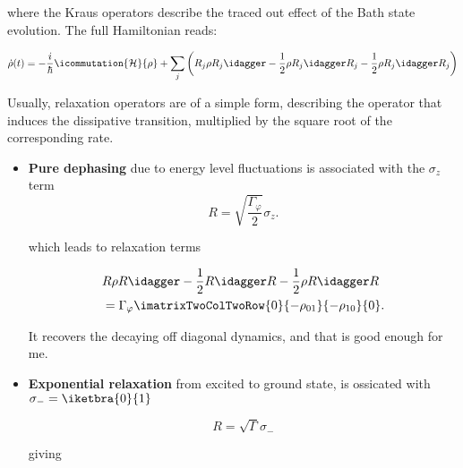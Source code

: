   \noindent where the Kraus operators describe the traced out effect of
  the Bath state evolution.  The full Hamiltonian reads:

 \begin{equation}\label{eq:linrelax_6}
   \dot{\rho}(t) = -\frac{i}{\hbar}\icommutation{\mathcal{H}}{\rho} + \sum_j\left(R_j\rho R_j\idagger - \frac{1}{2}\rho R_j\idagger R_j - \frac{1}{2}\rho R_j\idagger R_j\right)
 \end{equation}


\begin{framed}\noindent
  Usually, relaxation  operators are of  a simple form,  describing the
  operator that  induces the dissipative transition,  multiplied by the
  square root of the corresponding  rate.  
  \begin{itemize}
  \item  \textbf{Pure  dephasing}  due  to  energy  level  fluctuations
     is associated
    with the $ \sigma_z $ term
    \begin{equation}\label{eq:linrelax_7}
      R = \sqrt{\frac{\Gamma_{\varphi}}{2}}\sigma_z.
    \end{equation}

    \noindent which leads to relaxation terms

    \begin{equation}\label{eq:linrelax_8}
      \begin{aligned}
        &R\rho R\idagger - \frac{1}{2}R\idagger R - \frac{1}{2}\rho R\idagger R\\
        &                                                             =
        \Gamma_{\varphi}\imatrixTwoColTwoRow{0}{-\rho_{01}}{-\rho_{10}}{0}.
      \end{aligned}
    \end{equation}

    \noindent It recovers the decaying  off diagonal dynamics, and that
    is good enough for me.

  \item \textbf{Exponential  relaxation} from excited to  ground state,
    is ossicated with $ \sigma_{-} = \iketbra{0}{1}$

    \begin{equation}\label{key}
      R = \sqrt{\Gamma}\sigma_{-}
    \end{equation}

    \noindent giving


\end{itemize}
\end{framed}
